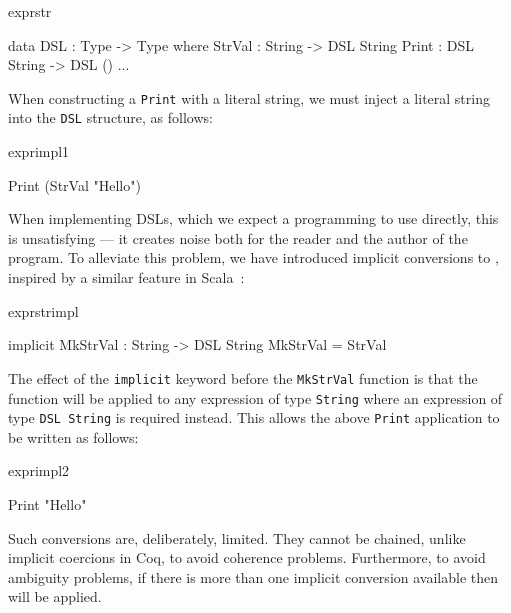 \begin{SaveVerbatim}{exprstr}

data DSL    : Type -> Type where
     StrVal : String -> DSL String
     Print  : DSL String -> DSL ()
     ...

\end{SaveVerbatim}

\noindent
When constructing a \texttt{Print} with a literal string, we must inject
a literal string into the \texttt{DSL} structure, as follows:

\begin{SaveVerbatim}{exprimpl1}

Print (StrVal "Hello") 

\end{SaveVerbatim}

\noindent
When implementing  DSLs, which we expect a programming to use
directly, this is unsatisfying --- it creates noise both for the reader and
the author of the program. To alleviate this problem, we have introduced
implicit conversions to \Idris{}, inspired by a similar feature in
Scala~\cite{Scala}:

\begin{SaveVerbatim}{exprstrimpl}

implicit MkStrVal : String -> DSL String
MkStrVal = StrVal

\end{SaveVerbatim}

\noindent
The effect of the \texttt{implicit} keyword before the \texttt{MkStrVal}
function is that the function will be applied to any expression of type
\texttt{String} where an expression of type \texttt{DSL String} is required
instead. This allows the above \texttt{Print} application to be written
as follows:


\begin{SaveVerbatim}{exprimpl2}

Print "Hello"

\end{SaveVerbatim}

\noindent
Such conversions are, deliberately, limited. They cannot be chained, unlike
implicit coercions in Coq, to avoid coherence problems. Furthermore, to avoid
ambiguity problems, if there is more than one implicit conversion available
then  will be applied.



